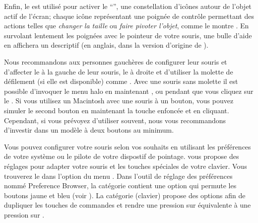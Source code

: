 \documentclass[a4paper,10pt,twoside]{book}
\begin{document}

Enfin, le  est utilisé pour activer le
``'', une constellation d'ic\^ones autour de l'objet
actif de l'écran; chaque ic\^one repr\'esentant une poign\'ee de contr\^ole
permettant des actions telles que \emph{changer la taille} ou
\emph{faire pivoter l'objet}, comme le montre .
En survolant lentement les poignées avec le pointeur de votre souris,
une bulle d'aide en affichera un descriptif
(en anglais, dans la version d'origine de \sq).


Nous recommandons aux personnes gauchères de configurer leur souris et d'affecter le  à la gauche de leur souris, le  à droite et d'utiliser la molette de défilement (si elle est disponible) comme .
Avec une souris sans molette il est possible d'invoquer le menu halo
en maintenant , 
ou  pendant que vous cliquez sur le .
Si vous utilisez un Macintosh avec une souris à un bouton, vous pouvez
simuler le second bouton en maintenant la touche \clover{} enfoncée et
en cliquant. Cependant, si vous prévoyez d'utiliser \sq souvent, nous
vous recommandons d'investir dans un modèle à deux boutons au minimum.

Vous pouvez configurer votre souris selon vos souhaits en utilisant les préférences de votre système ou le pilote de votre dispostif de pointage.
\sq vous propose des réglages pour adapter votre souris et les touches spéciales de votre clavier. Vous trouverez le  dans l'option  du menu .
Dans l'outil de r\'eglage des pr\'ef\'erences nomm\'e Preference
Browser, la catégorie  contient une option
 qui permute les boutons jaune et bleu (voir
). La cat\'egorie  (clavier)
propose des options afin de dupliquer les touches de commandes et 
rendre une pression sur  \'equivalente à une pression sur .
\end{document}
